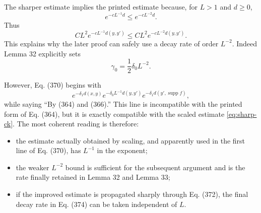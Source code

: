 \documentclass[11pt]{article}
\newcommand{\supp}{\operatorname{supp}}
\begin{document}
The sharper estimate implies the printed estimate because, for \(L>1\) and
\(d\ge0\),
\[
  e^{-cL^{-1}d}\le e^{-cL^{-2}d}.
\]
Thus
\[
  C L^2e^{-cL^{-1}d(y,y')}
  \le
  C L^2e^{-cL^{-2}d(y,y')}.
\]
This explains why the later proof can safely use a decay rate of order \(L^{-2}\).
Indeed Lemma 32 explicitly sets
\[
  \gamma_0=\frac12\delta_0L^{-2}.
\]

However, Eq. (370) begins with
\[
  e^{-\delta_1d(x,y)}
  e^{-\delta_0L^{-1}d(y,y')}
  e^{-\delta_1d(y',\supp f)},
\]
while saying ``By (364) and (366).''  This line is incompatible with the printed
form of Eq. (364), but it is exactly compatible with the scaled estimate
\eqref{eq:sharp-ck}.  The most coherent reading is therefore:
\begin{itemize}
  \item the estimate actually obtained by scaling, and apparently used in the
  first line of Eq. (370), has \(L^{-1}\) in the exponent;
  \item the weaker \(L^{-2}\) bound is sufficient for the subsequent argument and
  is the rate finally retained in Lemma 32 and Lemma 33;
  \item if the improved estimate is propagated sharply through Eq. (372), the
  final decay rate in Eq. (374) can be taken independent of \(L\).
\end{itemize}
\end{document}
